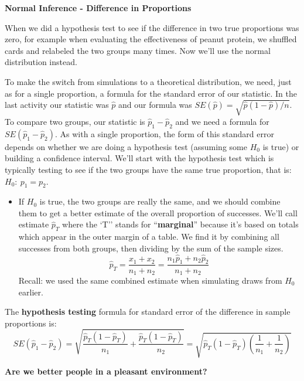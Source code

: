 \def\theTopic{Difference in Proportions - Z }
\def\dayNum{23 }


\begin{center}
{\bf {\large \textbf{Normal Inference - Difference in Proportions}}}
\end{center}


When we did a hypothesis test to see if the difference in  two true
proportions was zero,  for example when evaluating the effectiveness
of peanut protein, we shuffled cards and relabeled the two groups many
times. Now we'll use the normal distribution instead.  
  

 To make the switch from simulations to a theoretical distribution,
 we need, just as for a single proportion, a formula for the standard
 error of our statistic.  In the last activity our statistic was
 $\widehat{p}$ and our formula was $SE(\widehat{p}) =
 \sqrt{\widehat{p}(1-\widehat{p})/n}$.  To compare two groups, our 
statistic is $\widehat{p}_1 - \widehat{p}_2$ and we need a formula for
$SE(\widehat{p}_1 - \widehat{p}_2)$. As with a single proportion, the
form of this standard error depends on whether we are doing a
hypothesis test (assuming some $H_0$ is true) or building a confidence
interval.  We'll start with the hypothesis test which is typically
testing to see if the two groups have the same true proportion, that
is:  $H_0:\ p_1 = p_2$.
 \begin{itemize}
 \item If $H_0$ is true, the two groups are really the same, and we
   should combine them to get a better estimate of the overall
   proportion of successes. We'll call estimate $\widehat{p}_T$ where
   the `T'' stands for ``{\bf marginal}'' because it's
   based on totals which appear in the outer margin of a table.  We
   find it by combining all successes from both 
   groups, then dividing by the sum of the sample sizes. 
  $$\widehat{p}_T = \frac{x_1 + x_2}{n_1+n_2} = \frac{n_1\widehat{p}_1
    + n_2\widehat{p}_2}{n_1 + n_2}$$ 
  Recall:  we used the same combined estimate when simulating draws
  from $H_0$ earlier.
 \end{itemize}

 The {\bf hypothesis testing} formula for standard error of the
 difference in sample proportions is: 
 $$SE(\widehat{p}_1 - \widehat{p}_2) =
 \sqrt{\frac{\widehat{p}_T(1-\widehat{p}_T)}{n_1} +
   \frac{\widehat{p}_T(1-\widehat{p}_T)}{n_2}} =
  \sqrt{\widehat{p}_T(1-\widehat{p}_T)\left(\frac{1}{n_1} +
   \frac{1}{n_2}\right)}$$


\begin{center}
\vspace*{.1in}
{\bf {\large Are we better people in a pleasant environment?}}
\end{center}
\vspace{-.1in}

